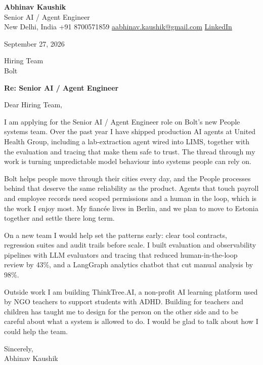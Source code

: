 \documentclass[11pt,a4paper]{article}
\begin{document}
{\Large\bfseries Abhinav Kaushik}\\
Senior AI / Agent Engineer\\
New Delhi, India \textbar{} +91 8700571859 \textbar{} \href{mailto:aabhinav.kaushik@gmail.com}{aabhinav.kaushik@gmail.com} \textbar{} \href{https://www.linkedin.com/in/abhinav-kaushik10/}{LinkedIn}  

September 27, 2026

Hiring Team\\
Bolt

\textbf{Re: Senior AI / Agent Engineer}

Dear Hiring Team,

I am applying for the Senior AI / Agent Engineer role on Bolt's new People systems team. Over the past year I have shipped production AI agents at United Health Group, including a lab-extraction agent wired into LIMS, together with the evaluation and tracing that make them safe to trust. The thread through my work is turning unpredictable model behaviour into systems people can rely on.

Bolt helps people move through their cities every day, and the People processes behind that deserve the same reliability as the product. Agents that touch payroll and employee records need scoped permissions and a human in the loop, which is the work I enjoy most. My fiancée lives in Berlin, and we plan to move to Estonia together and settle there long term.

On a new team I would help set the patterns early: clear tool contracts, regression suites and audit trails before scale. I built evaluation and observability pipelines with LLM evaluators and tracing that reduced human-in-the-loop review by 43\%, and a LangGraph analytics chatbot that cut manual analysis by 98\%.

Outside work I am building ThinkTree.AI, a non-profit AI learning platform used by NGO teachers to support students with ADHD. Building for teachers and children has taught me to design for the person on the other side and to be careful about what a system is allowed to do. I would be glad to talk about how I could help the team.

Sincerely,\\[4pt]
Abhinav Kaushik
\end{document}
